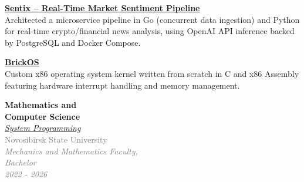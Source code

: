 \documentclass[10pt, a4paper]{article}
\begin{document}
\hfill %
\begin{minipage}[t]{0.4\textwidth}


\hspace{0.5cm}
\begin{minipage}[t]{0.9\textwidth}
    \raggedright
    \textbf{\Large \href{https://github.com/Isn0v/Sentix}{Sentix -- Real-Time Market Sentiment Pipeline}\extlink}  \\[2pt]
    Architected a microservice pipeline in Go (concurrent data ingestion) and Python for real-time crypto/financial news analysis, using OpenAI API inference backed by PostgreSQL and Docker Compose. \\
\end{minipage}

\vspace{0.5cm}

\hspace{0.5cm}
\begin{minipage}[t]{0.9\textwidth}
    \raggedright
    \textbf{\Large \href{https://github.com/B0GDANPN/BrickOS/tree/main}{BrickOS}\extlink}  \\[2pt]
    Custom x86 operating system kernel written from scratch in C and x86 Assembly featuring hardware interrupt handling and memory management.
\end{minipage}


\begin{minipage}[t]{\textwidth}
    \raggedright
    \textbf{\Large Mathematics and \\Computer Science} \\[2pt]
    \textit{\large \href{https://education.nsu.ru/syspro/}{System Programming} \extlink} \\[4pt]
    \textcolor{graytext}{Novosibirsk State University} \\
    \textcolor{graytext}{\textit{Mechanics and Mathematics Faculty, \\Bachelor}\\ \textit{2022 - 2026}}
\end{minipage}


\end{minipage}
\end{document}
